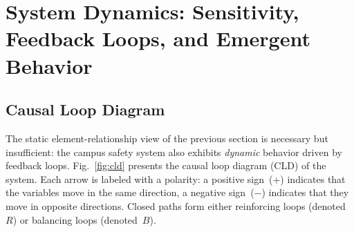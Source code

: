 \documentclass[conference]{IEEEtran}
\begin{document}
\section{System Dynamics: Sensitivity, Feedback Loops, and Emergent Behavior}

\subsection{Causal Loop Diagram}
\label{sec:cld}
The static element-relationship view of the previous section is
necessary but insufficient: the campus safety system also exhibits
\emph{dynamic} behavior driven by feedback loops. Fig.~\ref{fig:cld}
presents the causal loop diagram (CLD) of the system. Each arrow is
labeled with a polarity: a positive sign~(+) indicates that the
variables move in the same direction, a negative sign~(\(-\))
indicates that they move in opposite directions. Closed paths form
either reinforcing loops (denoted~\(R\)) or balancing loops
(denoted~\(B\)).
\end{document}
